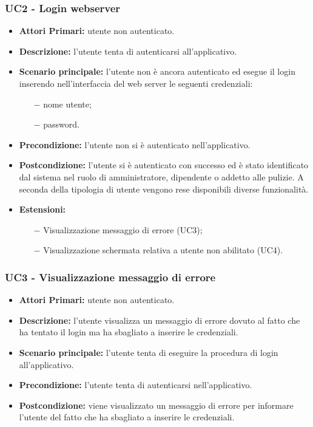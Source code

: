 \subsubsection{ UC2 - Login webserver}
\begin{itemize}
           	\item\textbf{Attori Primari:} utente non autenticato.
           	\item\textbf{Descrizione:} l’utente tenta di autenticarsi all'applicativo.
           	\item\textbf{Scenario principale:} l’utente non è ancora autenticato ed esegue il login inserendo nell'interfaccia del web server le seguenti credenziali:
           	\begin{itemize}
           		\item[$-$] nome utente;
           		\item[$-$] password.
           	\end{itemize}
           	\item\textbf{Precondizione:} l’utente non si è autenticato nell'applicativo. 
           	\item\textbf{Postcondizione:} l’utente si è autenticato con successo ed è stato identificato dal sistema nel ruolo di amministratore, dipendente o addetto alle pulizie. A seconda della tipologia di utente vengono rese
           	disponibili diverse funzionalità.
           	\item\textbf{Estensioni:}
           	\begin{itemize}
           		\item[$-$] Visualizzazione messaggio di errore (UC3);
           		\item[$-$] Visualizzazione schermata relativa a utente non abilitato (UC4).
           	\end{itemize}
\end{itemize}

\subsubsection{ UC3 - Visualizzazione messaggio di errore}
\begin{itemize}
	\item\textbf{Attori Primari:} utente non autenticato.
	\item\textbf{Descrizione:} l'utente visualizza un messaggio di errore dovuto al fatto che ha tentato il login ma ha sbagliato a inserire le credenziali.
	\item\textbf{Scenario principale:} l’utente tenta di eseguire la procedura di login all'applicativo.
	\item\textbf{Precondizione:} l'utente tenta di autenticarsi nell'applicativo.
	\item\textbf{Postcondizione:} viene visualizzato un messaggio di errore per informare l'utente del fatto che ha sbagliato a inserire le credenziali.
\end{itemize}
